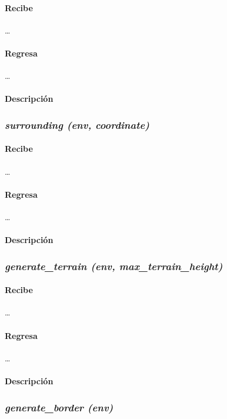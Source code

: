 \documentclass[12pt, letterpaper]{article}
\begin{document}
            \paragraph{Recibe}
            \dots
            \paragraph{Regresa}
            \dots
            \paragraph{Descripción}

        \subsubsection{\textit{surrounding (env, coordinate)}}

            \paragraph{Recibe}
            \dots
            \paragraph{Regresa}
            \dots
            \paragraph{Descripción}

        \subsubsection{\textit{generate\_terrain (env, max\_terrain\_height)}}

            \paragraph{Recibe}
            \dots
            \paragraph{Regresa}
            \dots
            \paragraph{Descripción}

        \subsubsection{\textit{generate\_border (env)}}
\end{document}
